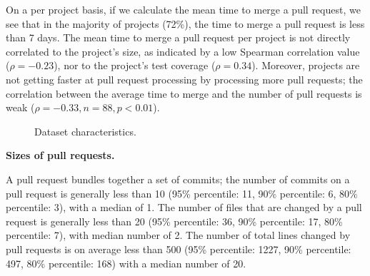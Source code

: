 \documentclass{acm_proc_article-sp}
\begin{document}
On a per project basis, if we calculate the mean time to merge a pull request,
we see that in the majority of projects (72\%), the time to merge a pull request
is less than 7 days. The mean time to merge a pull request per project is not
directly correlated to the project's size, as indicated by a low Spearman
correlation value ($\rho = -0.23$), nor to the project's test coverage ($\rho =
0.34$). Moreover, projects are not getting faster at pull request processing by
processing more pull requests; the correlation between the average time to merge
and the number of pull requests is weak ($\rho = -0.33, n = 88, p < 0.01$).


\begin{figure}
\centering
\caption{Dataset characteristics.}
\end{figure}

\textbf{Sizes of pull requests.}

A pull request bundles together a set of commits; the number of commits on a
pull request is generally less than 10 (95\% percentile: 11, 90\% percentile: 6,
80\% percentile: 3), with a median of 1. The number of files that are changed by
a pull request is generally less than 20 (95\% percentile: 36, 90\% percentile:
17, 80\% percentile: 7), with median number of 2. The number of total lines
changed by pull requests is on average less than 500 (95\% percentile: 1227,
90\% percentile: 497, 80\% percentile: 168) with a median number of 20.
\end{document}
